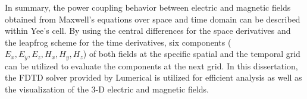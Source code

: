     \clearpage
    In summary, the power coupling behavior between electric and magnetic fields 
    obtained from Maxwell's equations over space and time domain can be described within Yee's cell. 
    By using the central differences for the space derivatives and the leapfrog scheme for the time derivatives, 
    six components ($E_x, E_y, E_z, H_x, H_y, H_z$) of both fields at the specific spatial and 
    the temporal grid can be utilized to evaluate 
    the components at the next grid. 
    In this dissertation, 
    the FDTD solver provided by Lumerical \cite{lu-fdtd} is utilized 
    for efficient analysis as well as the visualization of the 3-D electric and magnetic fields. 
    